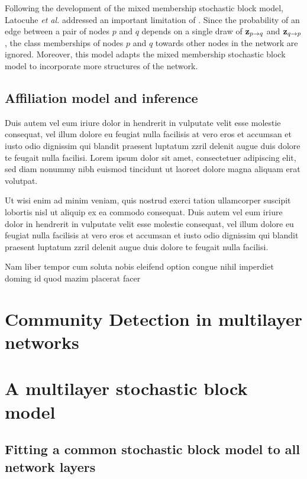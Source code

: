 Following the development of the mixed membership stochastic block model, Latocuhe \emph{et al.} \cite{LA} addressed an important limitation of \cite{mixMember}. Since the probability of an edge between a pair of nodes $p$ and $q$ depends on a single draw of ${\bf z}_{p\rightarrow q}$ and ${\bf z}_{q\rightarrow p}$, the class memberships of nodes $p$ and $q$ towards other nodes in the network are ignored. Moreover, this model adapts the mixed membership stochastic block model to incorporate more structures of the network. 

\section{Affiliation model and inference}


Duis autem vel eum iriure dolor in hendrerit in vulputate velit esse molestie consequat, vel illum dolore eu feugiat nulla facilisis at vero eros et accumsan et iusto odio dignissim qui blandit praesent luptatum zzril delenit augue duis dolore te feugait nulla facilisi. Lorem ipsum dolor sit amet, consectetuer adipiscing elit, sed diam nonummy nibh euismod tincidunt ut laoreet dolore magna aliquam erat volutpat.   

Ut wisi enim ad minim veniam, quis nostrud exerci tation ullamcorper suscipit lobortis nisl ut aliquip ex ea commodo consequat. Duis autem vel eum iriure dolor in hendrerit in vulputate velit esse molestie consequat, vel illum dolore eu feugiat nulla facilisis at vero eros et accumsan et iusto odio dignissim qui blandit praesent luptatum zzril delenit augue duis dolore te feugait nulla facilisi.   

Nam liber tempor cum soluta nobis eleifend option congue nihil imperdiet doming id quod mazim placerat facer


\chapter{Community Detection in multilayer networks}

\chapter{A multilayer stochastic block model}

\section{Fitting a common stochastic block model to all network layers}

